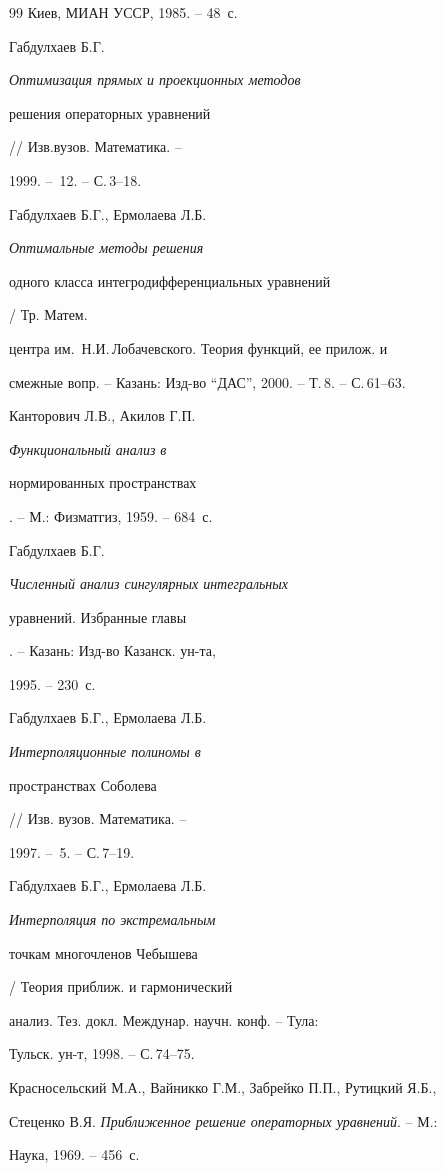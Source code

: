 \begin{thebibliography}{99}
Киев, МИАН УССР, 1985. -- 48~с.




Габдулхаев Б.Г. {\em Оптимизация прямых и проекционных методов 


решения операторных уравнений} // Изв.вузов. Математика. --


1999. -- \No\,12. -- С.\,3--18.




Габдулхаев Б.Г., Ермолаева Л.Б. {\em Оптимальные методы решения 


одного класса интегродифференциальных уравнений} / Тр. Матем. 


центра им.~Н.И.\,Лобачевского. Теория функций, ее прилож. и 


смежные вопр. -- Казань: Изд-во ``ДАС'', 2000. -- Т.\,8. -- С.\,61--63.




Канторович Л.В., Акилов Г.П. {\em Функциональный анализ в 


нормированных пространствах}. -- М.: Физматгиз, 1959. -- 684~с.




Габдулхаев Б.Г. {\em Численный анализ сингулярных интегральных 


уравнений. Избранные главы}. -- Казань: Изд-во Казанск. ун-та, 


1995. -- 230~с.




Габдулхаев Б.Г., Ермолаева Л.Б. {\em Интерполяционные полиномы в 


пространствах Соболева} // Изв. вузов. Математика. -- 


1997. -- \No\,5. -- С.\,7--19.




Габдулхаев Б.Г., Ермолаева Л.Б. {\em Интерполяция по экстремальным 


точкам многочленов Чебышева} / Теория приближ. и гармонический 


анализ. Тез. докл. Междунар. научн. конф. -- Тула:


Тульск. ун-т, 1998. -- С.\,74--75.




Красносельский М.А., Вайникко Г.М., Забрейко П.П., Рутицкий Я.Б., 


Стеценко В.Я. {\em Приближенное решение операторных уравнений}. -- М.: 


Наука, 1969. -- 456~с.



\end{thebibliography}

